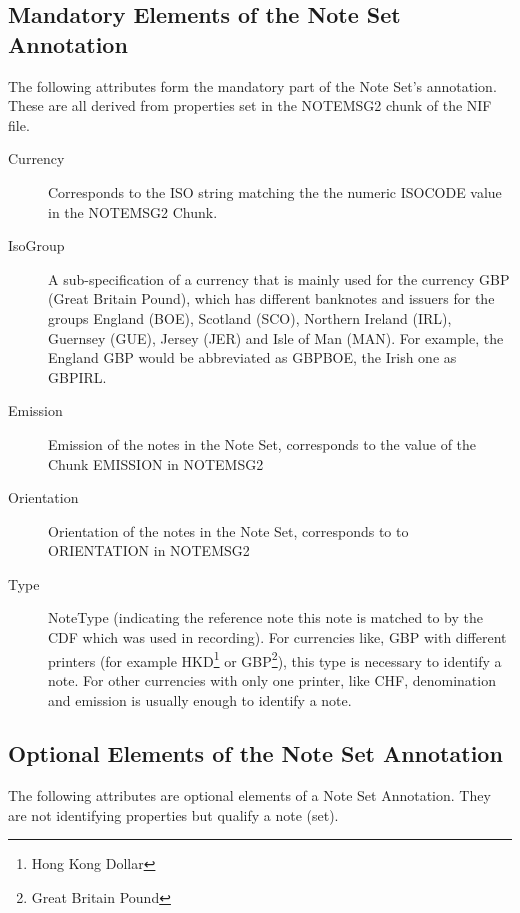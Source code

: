 \subsection{Mandatory Elements of the Note Set Annotation}
The following attributes form the mandatory part of the Note Set's annotation. These are all derived from properties set in the NOTEMSG2 chunk of the NIF file. 
\begin{description}
  \item[Currency] Corresponds to the ISO string matching the the numeric ISOCODE value in the NOTEMSG2 Chunk.
  \item[IsoGroup] A sub-specification of a currency that is mainly used for the currency GBP (Great Britain Pound), which has different banknotes and issuers for the groups England (BOE), Scotland (SCO), Northern Ireland (IRL), Guernsey (GUE), Jersey (JER) and Isle of Man (MAN). For example, the England GBP would be abbreviated as GBPBOE, the Irish one as GBPIRL.
  \item[Emission] Emission of the notes in the Note Set, corresponds to the value of the Chunk EMISSION in NOTEMSG2
  \item[Orientation] Orientation of the notes in the Note Set, corresponds to to ORIENTATION in NOTEMSG2
\item[Type] NoteType (indicating the reference note this note is matched to by the CDF which was used in recording). For currencies like, GBP with different printers (for example HKD\footnote{Hong Kong Dollar} or GBP\footnote{Great Britain Pound}), this type is necessary to identify a note. For other currencies with only one printer, like CHF, denomination and emission is usually enough to identify a note.
\end{description}

\subsection{Optional Elements of the Note Set Annotation}
The following attributes are optional elements of a Note Set Annotation. They are not identifying properties but qualify a note (set).

